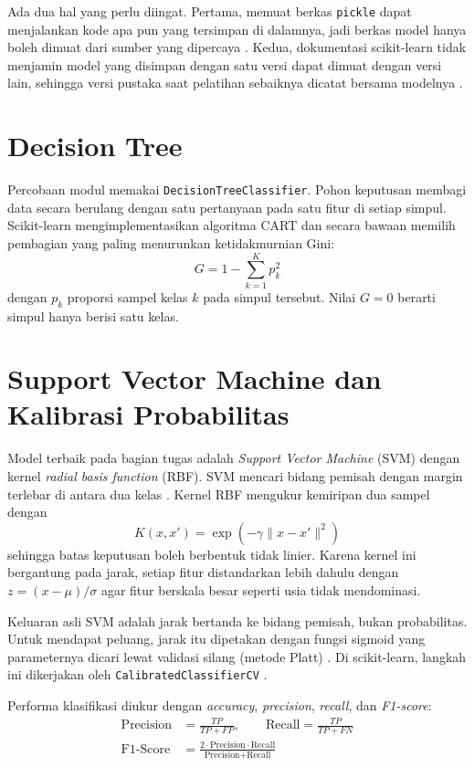 \documentclass[a4paper,oneside,12pt]{report}
\begin{document}
Ada dua hal yang perlu diingat. Pertama, memuat berkas \texttt{pickle} dapat menjalankan kode apa pun yang tersimpan di dalamnya, jadi berkas model hanya boleh dimuat dari sumber yang dipercaya \cite{python-pickle}. Kedua, dokumentasi scikit-learn tidak menjamin model yang disimpan dengan satu versi dapat dimuat dengan versi lain, sehingga versi pustaka saat pelatihan sebaiknya dicatat bersama modelnya \cite{sklearn-persistence}.

\section{Decision Tree}
Percobaan modul memakai \texttt{DecisionTreeClassifier}. Pohon keputusan membagi data secara berulang dengan satu pertanyaan pada satu fitur di setiap simpul. Scikit-learn mengimplementasikan algoritma CART \cite{breiman1984, sklearn2011} dan secara bawaan memilih pembagian yang paling menurunkan ketidakmurnian Gini:
\begin{equation}
	G = 1 - \sum_{k=1}^{K} p_k^2
\end{equation}
dengan $p_k$ proporsi sampel kelas $k$ pada simpul tersebut. Nilai $G = 0$ berarti simpul hanya berisi satu kelas.

\section{Support Vector Machine dan Kalibrasi Probabilitas}
Model terbaik pada bagian tugas adalah \textit{Support Vector Machine} (SVM) dengan kernel \textit{radial basis function} (RBF). SVM mencari bidang pemisah dengan margin terlebar di antara dua kelas \cite{cortes1995}. Kernel RBF mengukur kemiripan dua sampel dengan
\begin{equation}
	K(x, x') = \exp\left(-\gamma \lVert x - x' \rVert^2\right)
\end{equation}
sehingga batas keputusan boleh berbentuk tidak linier. Karena kernel ini bergantung pada jarak, setiap fitur distandarkan lebih dahulu dengan $z = (x - \mu) / \sigma$ agar fitur berskala besar seperti usia tidak mendominasi.

Keluaran asli SVM adalah jarak bertanda ke bidang pemisah, bukan probabilitas. Untuk mendapat peluang, jarak itu dipetakan dengan fungsi sigmoid yang parameternya dicari lewat validasi silang (metode Platt) \cite{platt1999}. Di scikit-learn, langkah ini dikerjakan oleh \texttt{CalibratedClassifierCV} \cite{sklearn-calibration}.

Performa klasifikasi diukur dengan \textit{accuracy}, \textit{precision}, \textit{recall}, dan \textit{F1-score}:
\begin{align}
	\text{Precision} & = \frac{TP}{TP + FP}, \qquad \text{Recall} = \frac{TP}{TP + FN} \\
	\text{F1-Score}  & = \frac{2 \cdot \text{Precision} \cdot \text{Recall}}{\text{Precision} + \text{Recall}}
\end{align}
\end{document}
